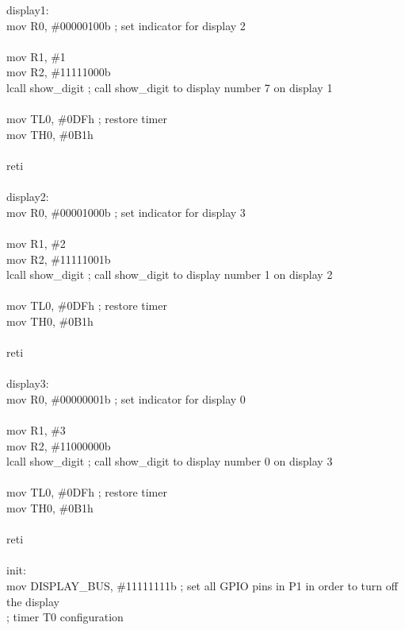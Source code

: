\documentclass{article}
\begin{document}
display1:\\
    mov     R0, \#00000100b      ; set indicator for display 2\\
\\
    mov     R1, \#1\\
    mov     R2, \#11111000b      \\
    lcall   show\_digit          ; call show\_digit to display number 7 on display 1\\
    \\
    mov     TL0, \#0DFh          ; restore timer\\
    mov     TH0, \#0B1h\\
\\
    reti\\
\\
display2:\\
    mov     R0, \#00001000b      ; set indicator for display 3\\
\\
    mov     R1, \#2\\
    mov     R2, \#11111001b\\
    lcall   show\_digit          ; call show\_digit to display number 1 on display 2\\
    \\
    mov     TL0, \#0DFh          ; restore timer\\
    mov     TH0, \#0B1h\\
\\
    reti\\
\\
display3:\\
    mov     R0, \#00000001b      ; set indicator for display 0\\
\\
    mov     R1, \#3\\
    mov     R2, \#11000000b\\
    lcall   show\_digit          ; call show\_digit to display number 0 on display 3\\
    \\
    mov     TL0, \#0DFh          ; restore timer\\
    mov     TH0, \#0B1h\\
\\
    reti\\
\\
init:\\
    mov     DISPLAY\_BUS, \#11111111b ; set all GPIO pins in P1 in order to turn off the display\\
; timer T0 configuration\\
\end{document}
